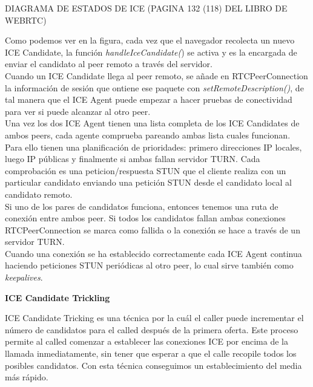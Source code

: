 DIAGRAMA DE ESTADOS DE ICE (PAGINA 132 (118) DEL LIBRO DE WEBRTC)

Como podemos ver en la figura, cada vez que el navegador recolecta un nuevo ICE Candidate, la función \textit{handleIceCandidate(}) se activa y es la encargada de enviar el candidato al peer remoto a través del servidor.\\
 
Cuando un ICE Candidate llega al peer remoto, se añade en RTCPeerConnection la información de sesión que ontiene ese paquete con \textit{setRemoteDescription()}, de tal manera que el ICE Agent puede empezar a hacer pruebas de conectividad para ver si puede alcanzar al otro peer.\\

Una vez los dos ICE Agent tienen una lista completa de los ICE Candidates de ambos peers, cada agente comprueba pareando ambas lista cuales funcionan. Para ello tienen una planificación de prioridades: primero direcciones IP locales, luego IP públicas y finalmente si ambas fallan servidor TURN. Cada comprobación es una peticion/respuesta STUN que el cliente realiza con un particular candidato enviando una petición STUN desde el candidato local al candidato remoto.\\

Si uno de los pares de candidatos funciona, entonces tenemos una ruta de conexión entre ambos peer. Si todos los candidatos fallan ambas conexiones RTCPeerConnection se marca como fallida o la conexión se hace a través de un servidor TURN.\\

Cuando una conexión se ha establecido correctamente cada ICE Agent continua haciendo peticiones STUN periódicas al otro peer, lo cual sirve también como \textit{keepalives}.\\

\begin{normalsize}
\noindent \textbf{ICE Candidate Trickling}\\
\end{normalsize}

ICE Candidate Tricking es una técnica por la cuál el caller puede incrementar el número de candidatos para el called después de la primera oferta. Este proceso permite al called comenzar a establecer las conexiones ICE por encima de la llamada inmediatamente, sin tener que esperar a que el calle recopile todos los posibles candidatos. Con esta técnica conseguimos un establecimiento del media más rápido.\\

